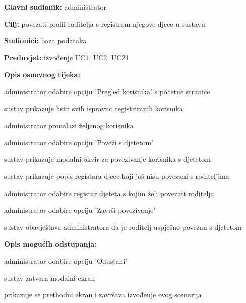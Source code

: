                     \noindent {}
					\begin{packed_item}
	
						\item \textbf{Glavni sudionik: }administrator
						\item  \textbf{Cilj:} povezati profil roditelja s registrom njegove djece u sustavu
						\item  \textbf{Sudionici:} baza podataka
						\item  \textbf{Preduvjet:} izvođenje UC1, UC2, UC21
						\item  \textbf{Opis osnovnog tijeka:}
						
						\item[] \begin{packed_enum}
							\item administrator odabire opciju 'Pregled korisnika' s početne stranice
							\item sustav prikazuje listu svih ispravno registriranih korisnika
							\item administrator pronalazi željenog korisnika
							\item administrator odabire opciju 'Poveži s djetetom'
							\item sustav prikazuje modalni okvir za povezivanje korisnika s djetetom
							\item sustav prikazuje popis registara djece koji još nisu povezani s roditeljima
							\item administrator odabire registar djeteta s kojim želi povezati roditelja
							\item administrator odabire opciju 'Završi povezivanje'
							\item sustav obavještava administratora da je roditelj uspješno povezan s djetetom
						
						\end{packed_enum}
						\item  \textbf{Opis mogućih odstupanja:}
						
						\item[] \begin{packed_item}
							\item[8.a] administrator odabire opciju 'Odustani'
							\item [] \begin{packed_enum}
								\item sustav zatvara modalni ekran
								\item prikazuje se prethodni ekran i završava izvođenje ovog scenarija
							\end{packed_enum}
						\end{packed_item}
					\end{packed_item}
                    
